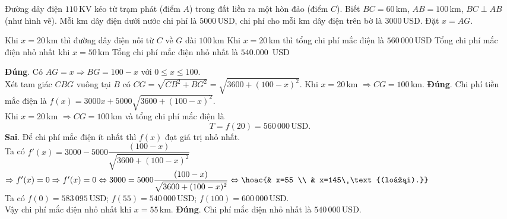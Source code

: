 \begin{ex}%

Đường dây điện $110\,$KV kéo từ trạm phát (điểm $A$) trong đất liền ra một hòn đảo (điểm $C$). Biết $B C=60\,$km, $A B=100\,$km, $BC\perp AB$ (như hình vẽ). Mỗi km dây điện dưới nước chi phí là $5000\,$USD, chi phí cho mỗi km dây điện trên bờ là $3000\,$USD. Đặt $x=A G$.
\begin{center}
\end{center}
\choiceTF
{\True Khi $x=20\,$km thì đường dây điện nối từ $C$ về $G$ dài $100\,$km}
{\True Khi $x=20\,$km thì tổng chi phí mắc điện là $560\,000\,$USD}
{Tổng chi phí mắc điện nhỏ nhất khi $x=50\,$km}
{\True Tổng chi phí mắc điện nhỏ nhất là $540.000\,$ USD}
\loigiai
{
\begin{itemchoice}
	\itemch \textbf{Đúng}. Có $AG=x \Rightarrow BG=100-x$ với $0 \leq x \leq 100$.\\			
	Xét tam giác $CBG$ vuông tại $B$ có $CG=\sqrt{CB^2+BG^2}=\sqrt{3600+(100-x)^2}$.
	Khi $x=20\,$km $\Rightarrow CG=100\,$km.
	\itemch \textbf{Đúng}. Chi phí tiền mắc điện là $f(x)=3000 x+5000\sqrt{3600+(100-x)^2}$.\\			
	Khi $x=20\,$km $\Rightarrow C G=100\,$km và tổng chi phí mắc điện là $$T=f(20)=560\, 000\,\text{USD}.$$
	\itemch \textbf{Sai}. Để chi phí mắc điện ít nhất thì $f(x)$ đạt giá trị nhỏ nhất.\\
	Ta có $f'(x)=3000-5000 \dfrac{(100-x)}{\sqrt{3600+(100-x)^2}}$\\
	$\Rightarrow f'(x)=0 \Rightarrow f'(x)=0 \Leftrightarrow 3000=5000 \dfrac{(100-x)}{\sqrt{3600+(100-x)^2}} \Leftrightarrow\hoac{& x=55 \\ & x=145\ \text{(loại).}}$\\			
	Ta có $f(0)=583\,095\,$USD; $f(55)=540\,000\,$USD; $f(100)=600\,000\,$USD.\\
	Vậy chi phí mắc điện nhỏ nhất khi $x=55\,$km.
	\itemch \textbf{Đúng}. Chi phí mắc điện nhỏ nhất là $540\,000\,$USD. 
\end{itemchoice}
}
\end{ex}

